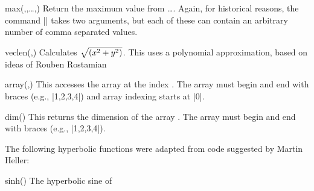 \begin{math-function}{max(,,\ldots,)}
    Return the maximum value from \ldots{}. Again, for
    historical reasons, the command |\pgfmathmax| takes two arguments, but each
    of these can contain an arbitrary number of comma separated values.
\begin{codeexample}[]
 \pgfmathresult
\end{codeexample}
\end{math-function}

\begin{math-function}{veclen(,)}
\mathcommand
    Calculates $\sqrt{\left(x^2+y^2\right)}$.
    This uses a polynomial approximation, based on ideas of Rouben Rostamian
\begin{codeexample}[]
 \pgfmathresult
\end{codeexample}
\end{math-function}

\begin{math-function}{array(,)}
\mathcommand
    This accesses the array  at the index . The array must
    begin and end with braces (e.g., |{1,2,3,4}|) and array indexing starts at
    |0|.
\begin{codeexample}[]
 \pgfmathresult
\end{codeexample}
\end{math-function}

\begin{math-function}{dim()}
\mathcommand
    This returns the dimension of the array . The array must begin and
    end with braces (e.g., |{1,2,3,4}|).
\begin{codeexample}[]
 \pgfmathresult
\end{codeexample}
\end{math-function}

The following hyperbolic functions were adapted from code suggested by Martin
Heller:

\begin{math-function}{sinh()}
\mathcommand
    The hyperbolic sine of 
\begin{codeexample}[]
 \pgfmathresult
\end{codeexample}
\end{math-function}

